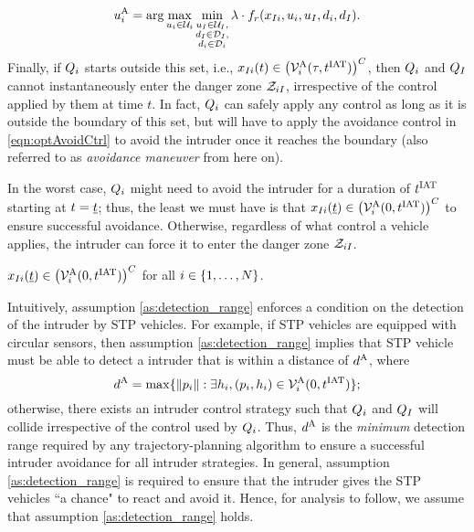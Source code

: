 \begin{equation} \label{eqn:optAvoidCtrl}
{\ctrl^{\text{A}}_{i}} = \arg \max_{\ctrl_i \in \cset_i} \min_{\substack{\ctrl_\intr \in \cset_\intr, \\ \dstb_\intr \in \dset_\intr, \\ \dstb_i \in \dset_i}} \costate \cdot f_r(\state_{\intr i}, \ctrl_i, \ctrl_\intr, \dstb_i, \dstb_\intr).
\end{equation}
\noindent Finally, if $Q_i$ starts outside this set, i.e., $x_{I i}(t) \in \left( \mathcal{V}^{\text{A}}_{i}(\tau, t^\text{IAT})\right)^C$, then  $Q_i$ and $Q_{I}$ cannot instantaneously enter the danger zone $\mathcal{Z}_{iI}$, irrespective of the control applied by them at time $t$. In fact, $Q_i$ can safely apply any control as long as it is outside the boundary of this set, but will have to apply the avoidance control in \eqref{eqn:optAvoidCtrl} to avoid the intruder once it reaches the boundary (also referred to as \textit{avoidance maneuver} from here on).

In the worst case, $Q_i$ might need to avoid the intruder for a duration of $t^\text{IAT}$ starting at $t = \underline{t}$; thus, the least we must have is that $x_{I i}(\underline{t}) \in \left(\mathcal{V}^{\text{A}}_{i}(0, t^\text{IAT})\right)^C$ to ensure successful avoidance. Otherwise, regardless of what control a vehicle applies, the intruder can force it to enter the danger zone $\mathcal{Z}_{iI}$.
\begin{assumption}
\label{as:detection_range}
$x_{I i}(\underline{t}) \in \left(\mathcal{V}^{\text{A}}_{i}(0, t^\text{IAT})\right)^C$ for all $i \in \{1, \ldots, N\}$.
\end{assumption}

Intuitively, assumption \ref{as:detection_range} enforces a condition on the detection of the intruder by STP vehicles. For example, if STP vehicles are equipped with circular sensors, then assumption \ref{as:detection_range} implies that STP vehicle must be able to detect a intruder that is within a distance of $d^\text{A}$, where
\begin{equation} \label{eqn:sen_distance}
\dsen = \max\{ \|p_i\|: \exists \npos_i, (p_i, \npos_i) \in \brs^{\text{A}}_{i}(0, \iat) \};
\end{equation} 
otherwise, there exists an intruder control strategy such that $Q_i$ and $Q_{I}$ will collide irrespective of the control used by $Q_i$. Thus, $d^\text{A}$ is the \textit{minimum} detection range required by any trajectory-planning algorithm to ensure a successful intruder avoidance for all intruder strategies. In general, assumption \ref{as:detection_range} is required to ensure that the intruder gives the STP vehicles ``a chance" to react and avoid it. Hence, for analysis to follow, we assume that assumption \ref{as:detection_range} holds. 

